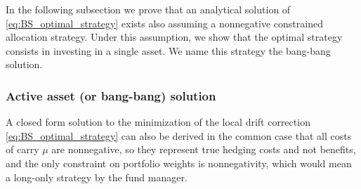 \documentclass[runningheads]{m2ef}
\begin{document}
	In the following subsection we prove that an analytical solution of \eqref{eq:BS_optimal_strategy} exists also assuming a nonnegative constrained allocation strategy. Under this assumption, we show that the optimal strategy consists in investing in a single asset. We name this strategy the bang-bang solution.

	\subsubsection{Active asset (or bang-bang) solution}
	A closed form solution to the minimization of the local drift correction \eqref{eq:BS_optimal_strategy} can also be derived in the common case that all costs of carry $\mu$ are nonnegative, so they represent true hedging costs and not benefits, and the only constraint on portfolio weights is nonnegativity, which would mean a long-only strategy by the fund manager.
\end{document}
